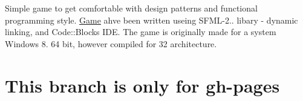 Simple game to get comfortable with design patterns and functional programming style. \hyperlink{class_game}{Game} ahve been written useing S\+F\+M\+L-\/2.. libary -\/ dynamic linking, and Code\+::\+Blocks I\+D\+E. The game is originally made for a system Windows 8. 64 bit, however compiled for 32 architecture. \section*{This branch is only for gh-\/pages}